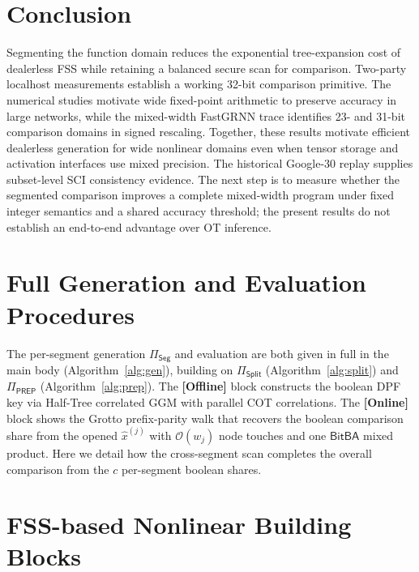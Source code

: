 \documentclass[journal]{IEEEtran}
\theoremstyle{definition}
\theoremstyle{plain}
\newcommand{\BitBA}{\mathsf{BitBA}}
\newcommand{\xhat}{\hat{x}}
\newcommand{\PREP}{\Pi_{\mathsf{PREP}}}
\newcommand{\bigO}{\mathcal{O}}
\newcommand{\seg}[1]{^{\scriptscriptstyle(#1)}}   %
\newcommand{\nseg}{c}                              %
\newcommand{\wseg}{w}                              %
\begin{document}
\section{Conclusion}\label{sec:conc}

Segmenting the function domain reduces the exponential tree-expansion cost
of dealerless FSS while retaining a balanced secure scan for comparison.
Two-party localhost measurements establish a working 32-bit comparison
primitive. The numerical studies motivate wide fixed-point arithmetic to
preserve accuracy in large networks, while the mixed-width FastGRNN trace
identifies 23- and 31-bit comparison domains in signed rescaling. Together,
these results motivate efficient dealerless generation for wide nonlinear
domains even when tensor storage and activation interfaces use mixed precision.
The historical Google-30 replay supplies subset-level SCI consistency evidence.
The next step is to measure whether the segmented comparison improves a
complete mixed-width program under fixed integer
semantics and a shared accuracy threshold; the present results do not establish
an end-to-end advantage over OT inference.

\appendices

\section{Full Generation and Evaluation Procedures}\label{app:full}

The per-segment generation $\Pi_{\mathsf{Seg}}$ and evaluation are both given in
full in the main body (Algorithm~\ref{alg:gen}), building on $\Pi_{\mathsf{Split}}$
(Algorithm~\ref{alg:split}) and $\PREP$ (Algorithm~\ref{alg:prep}). The \textbf{[Offline]}
block constructs the boolean DPF key via Half-Tree correlated GGM with parallel COT
correlations. The \textbf{[Online]} block shows the Grotto prefix-parity walk that
recovers the boolean comparison share from the opened $\xhat\seg{j}$ with $\bigO(\wseg_j)$
node touches and one $\BitBA$ mixed product. Here we detail how the cross-segment
scan completes the overall comparison from the $\nseg$ per-segment boolean shares.



\section{FSS-based Nonlinear Building Blocks}\label{appendix:Secure 3PC Protocols}
\end{document}
